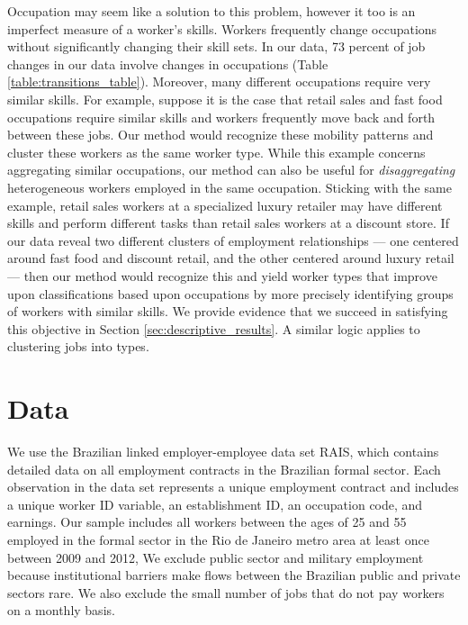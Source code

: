 \documentclass[12pt]{article}
\theoremstyle{definition}
\theoremstyle{plain}
\begin{document}
Occupation may seem like a solution to this problem, however it too is an imperfect measure of a worker's skills. Workers frequently change occupations without significantly changing their skill sets. In our data, 73 percent of job changes in our data involve changes in occupations (Table \ref{table:transitions_table}). Moreover, many different occupations require very similar skills. For example, suppose it is the case that retail sales and fast food occupations require similar skills and workers frequently move back and forth between these jobs. Our method would recognize these mobility patterns and cluster these workers as the same worker type. While this example concerns aggregating similar occupations, our method can also be useful for \emph{disaggregating} heterogeneous workers employed in the same occupation. Sticking with the same example, retail sales workers at a specialized luxury retailer may have different skills and perform different tasks than retail sales workers at a discount store.  If our data reveal two different clusters of employment relationships --- one centered around fast food and discount retail, and the other centered around luxury retail --- then our method would recognize this and yield worker types that improve upon classifications based upon occupations by more precisely identifying groups of workers with similar skills. We provide evidence that we succeed in satisfying this objective in Section \ref{sec:descriptive_results}. A similar logic applies to clustering jobs into types.




\section{Data} 
\label{sec:data}

We use the Brazilian linked employer-employee data set RAIS, which contains detailed data on all employment contracts in the Brazilian formal sector. Each observation in the data set represents a unique employment contract and includes a unique worker ID variable, an establishment ID, an occupation code, and earnings. Our sample includes all workers between the ages of 25 and 55 employed in the formal sector in the Rio de Janeiro metro area at least once between 2009 and 2012,  We exclude public sector and military employment because institutional barriers make flows between the Brazilian public and private sectors rare. We also exclude the small number of jobs that do not pay workers on a monthly basis.
\end{document}
